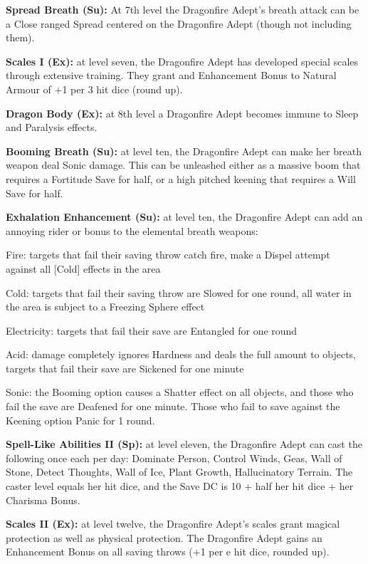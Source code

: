 \textbf{Spread Breath (Su):} At 7th level the Dragonfire Adept's breath attack can be a Close ranged Spread centered on the Dragonfire Adept (though not including them).

\textbf{Scales I (Ex):} at level seven, the Dragonfire Adept has developed special scales through extensive training. They grant and Enhancement Bonus to Natural Armour of +1 per 3 hit dice (round up).

\textbf{Dragon Body (Ex):} at 8th level a Dragonfire Adept becomes immune to Sleep and Paralysis effects.

\textbf{Booming Breath (Su):} at level ten, the Dragonfire Adept can make her breath weapon deal Sonic damage. This can be unleashed either as a massive boom that requires a Fortitude Save for half, or a high pitched keening that requires a Will Save for half.

\textbf{Exhalation Enhancement (Su):} at level ten, the Dragonfire Adept can add an annoying rider or bonus to the elemental breath weapons:

\begin{itemize*}
\item Fire: targets that fail their saving throw catch fire, make a Dispel attempt against all [Cold] effects in the area
\item Cold: targets that fail their saving throw are Slowed for one round, all water in the area is subject to a Freezing Sphere effect
\item Electricity: targets that fail their save are Entangled for one round
\item Acid: damage completely ignores Hardness and deals the full amount to objects, targets that fail their save are Sickened for one minute
\item Sonic: the Booming option causes a Shatter effect on all objects, and those who fail the save are Deafened for one minute. Those who fail to save against the Keening option Panic for 1 round.
\end{itemize*}

\textbf{Spell-Like Abilities II (Sp):} at level eleven, the Dragonfire Adept can cast the following once each per day: Dominate Person, Control Winds, Geas, Wall of Stone, Detect Thoughts, Wall of Ice, Plant Growth, Hallucinatory Terrain. The caster level equals her hit dice, and the Save DC is 10 + half her hit dice + her Charisma Bonus.

\textbf{Scales II (Ex):} at level twelve, the Dragonfire Adept's scales grant magical protection as well as physical protection. The Dragonfire Adept gains an Enhancement Bonus on all saving throws (+1 per e hit dice, rounded up).

